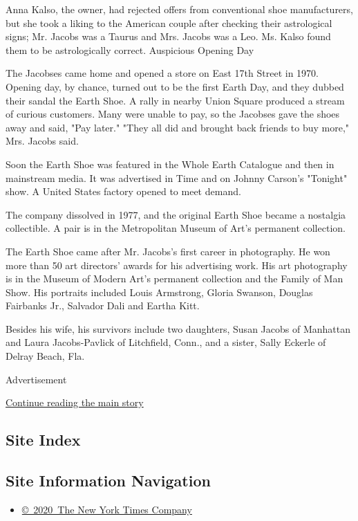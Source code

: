 Anna Kalso, the owner, had rejected offers from conventional shoe
manufacturers, but she took a liking to the American couple after
checking their astrological signs; Mr. Jacobs was a Taurus and Mrs.
Jacobs was a Leo. Ms. Kalso found them to be astrologically correct.
Auspicious Opening Day

The Jacobses came home and opened a store on East 17th Street in 1970.
Opening day, by chance, turned out to be the first Earth Day, and they
dubbed their sandal the Earth Shoe. A rally in nearby Union Square
produced a stream of curious customers. Many were unable to pay, so the
Jacobses gave the shoes away and said, "Pay later." "They all did and
brought back friends to buy more," Mrs. Jacobs said.

Soon the Earth Shoe was featured in the Whole Earth Catalogue and then
in mainstream media. It was advertised in Time and on Johnny Carson's
"Tonight" show. A United States factory opened to meet demand.

The company dissolved in 1977, and the original Earth Shoe became a
nostalgia collectible. A pair is in the Metropolitan Museum of Art's
permanent collection.

The Earth Shoe came after Mr. Jacobs's first career in photography. He
won more than 50 art directors' awards for his advertising work. His art
photography is in the Museum of Modern Art's permanent collection and
the Family of Man Show. His portraits included Louis Armstrong, Gloria
Swanson, Douglas Fairbanks Jr., Salvador Dali and Eartha Kitt.

Besides his wife, his survivors include two daughters, Susan Jacobs of
Manhattan and Laura Jacobs-Pavlick of Litchfield, Conn., and a sister,
Sally Eckerle of Delray Beach, Fla.

Advertisement

\protect\hyperlink{after-bottom}{Continue reading the main story}

\hypertarget{site-index}{%
\subsection{Site Index}\label{site-index}}

\hypertarget{site-information-navigation}{%
\subsection{Site Information
Navigation}\label{site-information-navigation}}

\begin{itemize}
\tightlist
\item
  \href{https://help.nytimes3xbfgragh.onion/hc/en-us/articles/115014792127-Copyright-notice}{©~2020~The
  New York Times Company}
\end{itemize}

